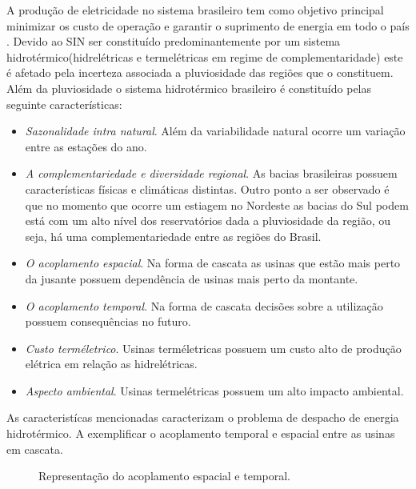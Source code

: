 A produ\c c\~ao de eletricidade no sistema brasileiro tem como objetivo principal minimizar
os custo de opera\c c\~ao e garantir o suprimento de energia em todo o pa\'is \cite{tom}. Devido ao SIN ser
constitu\'ido predominantemente por um sistema hidrot\'ermico(hidrel\'etricas e termel\'etricas em regime de
complementaridade) este \'e afetado pela incerteza associada a pluviosidade
das regi\~oes que o constituem\cite{an}. Al\'em da pluviosidade o sistema hidrot\'ermico brasileiro \'e constitu\'ido
pelas seguinte caracter\'isticas:
\begin{itemize}
	\item \textit{Sazonalidade intra natural}. Al\'em da variabilidade natural ocorre um varia\c c\~ao entre as esta\c
		c\~oes do ano. 
	\item \textit{A complementariedade e diversidade regional}. As bacias brasileiras possuem caracter\'isticas
		f\'isicas e clim\'aticas distintas. Outro ponto a ser observado \'e que no momento que ocorre um estiagem no
		Nordeste as bacias do Sul podem est\'a com um alto n\'ivel dos reservat\'orios dada a pluviosidade da regi\~ao,
		ou seja, h\'a uma complementariedade entre as regi\~oes do Brasil.
	\item \textit{O acoplamento espacial}. Na forma de cascata as usinas que est\~ao mais perto da jusante possuem depend\^encia
		de usinas mais perto da montante.
	\item \textit{O acoplamento temporal}. Na forma de cascata decis\~oes sobre a utiliza\c c\~ao possuem
		consequ\^encias no futuro. 
	\item \textit{Custo term\'eletrico}. Usinas term\'eletricas possuem um custo alto de produ\c c\~ao el\'etrica em
		rela\c c\~ao as hidrel\'etricas.
	\item \textit{Aspecto ambiental}. Usinas termel\'etricas possuem um alto impacto ambiental.
\end{itemize}

As caracterist\'icas mencionadas caracterizam o problema de despacho de energia hidrot\'ermico. A   exemplificar
o acoplamento temporal e espacial entre as usinas em cascata.
\begin{figure}[!htpb]
  \centering
  \resizebox{0.7\textwidth}{!}{%
  }
  \caption{Representa\c c\~ao do acoplamento espacial e temporal.}
  \label{st}
\end{figure}

